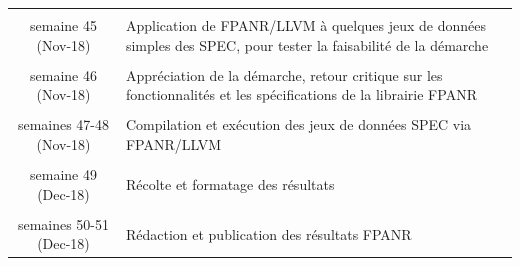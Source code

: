 \documentclass[a4paper,11pt]{article}
\begin{document}
\begin{table}[h]
\begin{tabular}{c|p{25em}}
		 & \\
		 semaine 45 (Nov-18) & Application de FPANR/LLVM à quelques jeux de données simples des SPEC, pour tester la faisabilité de la démarche \\
		 & \\
		 semaine 46 (Nov-18) & Appréciation de la démarche, retour critique sur les fonctionnalités et les spécifications de la librairie FPANR \\
		 & \\
		 semaines 47-48 (Nov-18) & Compilation et exécution des jeux de données SPEC via FPANR/LLVM \\
		 & \\
		 semaine 49 (Dec-18) & Récolte et formatage des résultats \\
		 & \\
		 semaines 50-51 (Dec-18) & Rédaction et publication des résultats FPANR \\
		 \end{tabular}
\end{table} 
\end{document}

